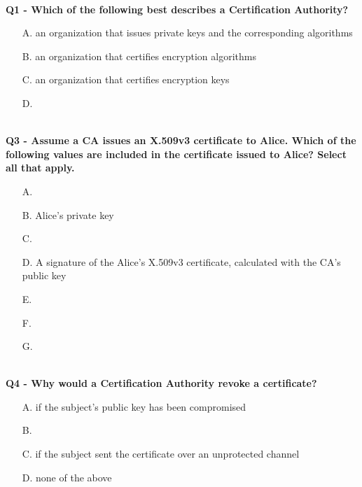 \textbf{\\Q1 - Which of the following best describes a Certification Authority?}
\begin{enumerate}
	\item[A.] an organization that issues private keys and the corresponding algorithms
	\item[B.] an organization that certifies encryption algorithms
	\item[C.] an organization that certifies encryption keys
	\item[D.] 
\end{enumerate}

\textbf{\\Q3 - Assume a CA issues an X.509v3 certificate to Alice. Which of the following values are included in the certificate issued to Alice? Select all that apply.}
\begin{itemize}
	\item[A.] 
	\item[B.] Alice’s private key
	\item[C.] 
	\item[D.] A signature of the Alice’s X.509v3 certificate, calculated with the CA’s public key
	\item[E.] 
	\item[F.] 
	\item[G.] 
\end{itemize}

\textbf{\\Q4 - Why would a Certification Authority revoke a certificate?}
\begin{enumerate}
	\item[A.] if the subject’s public key has been compromised
	\item[B.] 
	\item[C.] if the subject sent the certificate over an unprotected channel
	\item[D.] none of the above
\end{enumerate}

